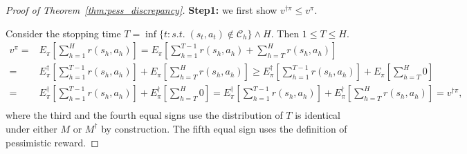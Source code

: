 \begin{proof}[Proof of Theorem~\ref{thm:pess_discrepancy}]
	\textbf{Step1:} we first show $v^{\dagger\pi}\leq v^\pi$.
	
	Consider the stopping time $T=\inf\{t:s.t.\;(s_t,a_t)\notin\mathcal{C}_h\}\land H$. Then $1\leq T\leq H$.
	{\small
	\begin{align*}
	v^\pi=&E_{\pi}\left[\sum_{h=1}^{H}  r\left(s_{h}, a_{h}\right)\right]=E_{\pi}\left[\sum_{h=1}^{T-1}  r\left(s_{h}, a_{h}\right)+\sum_{h=T}^{H} r\left(s_{h}, a_{h}\right)\right]\\
	=&E_{\pi}^\dagger\left[\sum_{h=1}^{T-1}  r\left(s_{h}, a_{h}\right)\right]+E_{\pi}\left[\sum_{h=T}^{H} r\left(s_{h}, a_{h}\right)\right]
	\geq E_{\pi}^\dagger\left[\sum_{h=1}^{T-1}  r\left(s_{h}, a_{h}\right)\right]+E_{\pi}\left[\sum_{h=T}^{H} 0\right]\\
	=& E_{\pi}^\dagger\left[\sum_{h=1}^{T-1}  r\left(s_{h}, a_{h}\right)\right]+E_{\pi}^\dagger\left[\sum_{h=T}^{H} 0\right]
	= E_{\pi}^\dagger\left[\sum_{h=1}^{T-1}  r\left(s_{h}, a_{h}\right)\right]+E_{\pi}^\dagger\left[\sum_{h=T}^{H} r(s_h,a_h)\right]=v^{\dagger\pi},\\
	\end{align*}}
	where the third and the fourth equal signs use the distribution of $T$ is identical under either $M$ or $M^\dagger$ by construction. The fifth equal sign uses the definition of pessimistic reward.
	

\end{proof}
